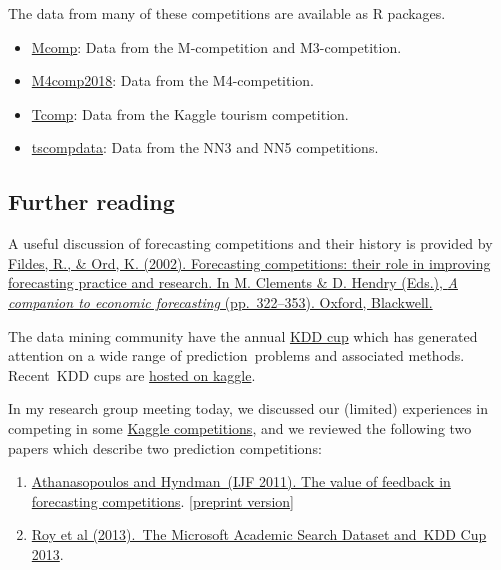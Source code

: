 \documentclass[11pt,a4paper,]{article}
\providecommand{\tightlist}{%
  \setlength{\itemsep}{0pt}\setlength{\parskip}{0pt}}
\begin{document}
The data from many of these competitions are available as R packages.

\begin{itemize}
\tightlist
\item
  \href{http://pkg.robjhyndman.com/Mcomp/}{Mcomp}: Data from the M-competition and M3-competition.
\item
  \href{https://github.com/carlanetto/M4comp2018}{M4comp2018}: Data from the M4-competition.
\item
  \href{https://cran.r-project.org/package=Tcomp}{Tcomp}: Data from the Kaggle tourism competition.
\item
  \href{https://github.com/robjhyndman/tscompdata}{tscompdata}: Data from the NN3 and NN5 competitions.
\end{itemize}

\hypertarget{further-reading}{%
\subsection{Further reading}\label{further-reading}}

A useful discussion of forecasting competitions and their history is provided by \href{https://doi.org/10.1002/9780470996430.ch15}{Fildes, R., \& Ord, K. (2002). Forecasting competitions: their role in improving forecasting practice and research. In M. Clements \& D. Hendry (Eds.), \emph{A companion to economic forecasting} (pp.~322--353). Oxford, Blackwell.}

The data mining community have the annual \href{http://kdd.org/kdd-cup}{KDD cup} which has generated attention on a wide range of prediction~problems and associated methods. Recent~KDD cups are \href{https://www.kaggle.com/c/kdd-cup-2014-predicting-excitement-at-donors-choose}{hosted on kaggle}.

In my research group meeting today, we discussed our (limited) experiences in competing in some \href{https://www.kaggle.com/competitions}{Kaggle competitions}, and we reviewed the following two papers which describe two prediction competitions:

\begin{enumerate}
\def\labelenumi{\arabic{enumi}.}
\item
  \href{http://dx.doi.org/10.1016/j.ijforecast.2011.03.002}{Athanasopoulos and Hyndman~(IJF 2011). The value of feedback in forecasting competitions}. {[}\href{/papers/kaggle.pdf}{preprint version}{]}
\item
  \href{http://www.kdd.org/kddcup2013/sites/default/files/papers/papers.pdf}{Roy et al (2013).~The Microsoft Academic Search Dataset and~KDD Cup 2013}.
\end{enumerate}
\end{document}
